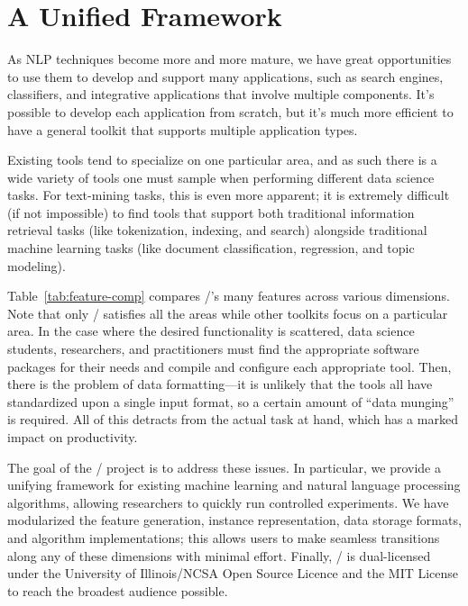\section{A Unified Framework}
\label{sec:framework}

As NLP techniques become more and more mature, we have great opportunities to
use them to develop and support many applications, such as search engines,
classifiers, and integrative applications that involve multiple components. It's
possible to develop each application from scratch, but it's much more efficient
to have a general toolkit that supports multiple application types.

Existing tools tend to specialize on one particular area, and as such there is a
wide variety of tools one must sample when performing different data science
tasks. For text-mining tasks, this is even more apparent; it is extremely
difficult (if not impossible) to find tools that support both traditional
information retrieval tasks (like tokenization, indexing, and search) alongside
traditional machine learning tasks (like document classification, regression,
and topic modeling).

Table~\ref{tab:feature-comp} compares \meta/'s many features across various
dimensions. Note that only \meta/ %
satisfies all the areas while other toolkits focus on a particular area. In the
case where the desired functionality is scattered, data science students,
researchers, and practitioners must find the appropriate software packages for
their needs and compile and configure each appropriate tool. Then, there is the
problem of data formatting---it is unlikely that the tools all have standardized
upon a single input format, so a certain amount of ``data munging'' is required.
All of this detracts from the actual task at hand, which has a marked impact on
productivity.

The goal of the \meta/ project is to address these issues. In particular, we
provide a unifying framework for existing machine learning and natural language
processing algorithms, allowing researchers to quickly run controlled
experiments. We have modularized the feature generation, instance
representation, data storage formats, and algorithm implementations; this allows
users to make seamless transitions along any of these dimensions with minimal
effort. Finally, \meta/ is dual-licensed under the University of Illinois/NCSA
Open Source Licence and the MIT License to reach the broadest audience possible.


